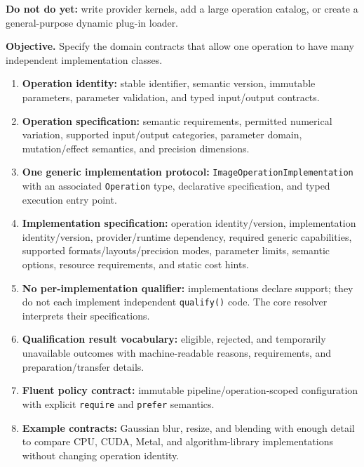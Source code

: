 \textbf{Do not do yet:} write provider kernels, add a large operation catalog, or create a general-purpose dynamic plug-in loader.


\textbf{Objective.} Specify the domain contracts that allow one operation to have many independent implementation classes.

\deliverables
\begin{enumerate}
  \item \textbf{Operation identity:} stable identifier, semantic version, immutable parameters, parameter validation, and typed input/output contracts.
  \item \textbf{Operation specification:} semantic requirements, permitted numerical variation, supported input/output categories, parameter domain, mutation/effect semantics, and precision dimensions.
  \item \textbf{One generic implementation protocol:} \texttt{ImageOperationImplementation} with an associated \texttt{Operation} type, declarative specification, and typed execution entry point.
  \item \textbf{Implementation specification:} operation identity/version, implementation identity/version, provider/runtime dependency, required generic capabilities, supported formats/layouts/precision modes, parameter limits, semantic options, resource requirements, and static cost hints.
  \item \textbf{No per-implementation qualifier:} implementations declare support; they do not each implement independent \texttt{qualify()} code. The core resolver interprets their specifications.
  \item \textbf{Qualification result vocabulary:} eligible, rejected, and temporarily unavailable outcomes with machine-readable reasons, requirements, and preparation/transfer details.
  \item \textbf{Fluent policy contract:} immutable pipeline/operation-scoped configuration with explicit \texttt{require} and \texttt{prefer} semantics.
  \item \textbf{Example contracts:} Gaussian blur, resize, and blending with enough detail to compare CPU, CUDA, Metal, and algorithm-library implementations without changing operation identity.
\end{enumerate}

